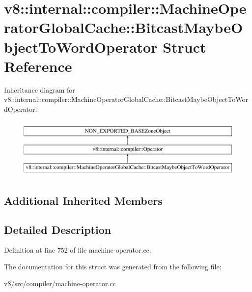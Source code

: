 \hypertarget{structv8_1_1internal_1_1compiler_1_1MachineOperatorGlobalCache_1_1BitcastMaybeObjectToWordOperator}{}\section{v8\+:\+:internal\+:\+:compiler\+:\+:Machine\+Operator\+Global\+Cache\+:\+:Bitcast\+Maybe\+Object\+To\+Word\+Operator Struct Reference}
\label{structv8_1_1internal_1_1compiler_1_1MachineOperatorGlobalCache_1_1BitcastMaybeObjectToWordOperator}
Inheritance diagram for v8\+:\+:internal\+:\+:compiler\+:\+:Machine\+Operator\+Global\+Cache\+:\+:Bitcast\+Maybe\+Object\+To\+Word\+Operator\+:\begin{figure}[H]
\begin{center}
\leavevmode
\includegraphics[height=3.000000cm]{structv8_1_1internal_1_1compiler_1_1MachineOperatorGlobalCache_1_1BitcastMaybeObjectToWordOperator}
\end{center}
\end{figure}
\subsection*{Additional Inherited Members}


\subsection{Detailed Description}


Definition at line 752 of file machine-\/operator.\+cc.



The documentation for this struct was generated from the following file\+:\begin{DoxyCompactItemize}
\item 
v8/src/compiler/machine-\/operator.\+cc\end{DoxyCompactItemize}
